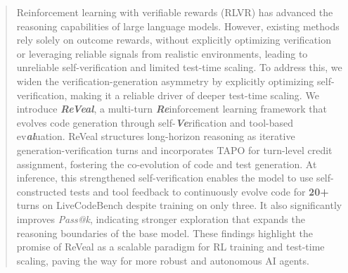 \documentclass{article} %
\begin{document}
\begin{abstract}
Reinforcement learning with verifiable rewards (RLVR) has advanced the reasoning capabilities of large language models. However, existing methods rely solely on outcome rewards, without explicitly optimizing verification or leveraging reliable signals from realistic environments, leading to unreliable self-verification and limited test-time scaling.
To address this, we widen the verification-generation asymmetry by explicitly optimizing self-verification, making it a reliable driver of deeper test-time scaling. 
We introduce \textbf{\textit{ReVeal}}, a multi-turn \textbf{\textit{Re}}inforcement learning framework that evolves code generation through self-\textbf{\textit{Ve}}rification and tool-based ev\textbf{\textit{al}}uation. ReVeal structures long-horizon reasoning as iterative generation-verification turns and incorporates TAPO for turn-level credit assignment, fostering the co-evolution of code and test generation.
At inference, this strengthened self-verification enables the model to use self-constructed tests and tool feedback to continuously evolve code for \textbf{20+} turns on LiveCodeBench despite training on only three. It also significantly improves \textit{Pass@k}, indicating stronger exploration that expands the reasoning boundaries of the base model. These findings highlight the promise of ReVeal as a scalable paradigm for RL training and test-time scaling, paving the way for more robust and autonomous AI agents.


\end{abstract}
\end{document}
